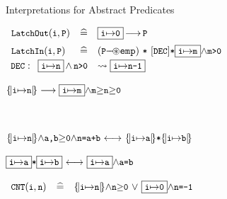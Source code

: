\documentclass[11pt]{beamer}
\begin{document}
\begin{frame}{Interpretations for Abstract Predicates}
\begin{small}
$
\begin{array}{lll}
\vspace{2mm}
 \LatchOut{i}{P} & \defs & \GLOBAL{i}{0} {\ourimply} \code{P}
\\
 \LatchIn{i}{P} &\defs &  (\code{P}{\septract}\emp) ~{\sep}~ [\DEC]  {\sep}\GLOBAL{i}{m} {\wedge}\code{m>0} 
 \\

\end{array}
$
$
\begin{array}{l}
\DEC: \begin{array}[t]{ll}
\GLOBAL{i}{n}\,{\wedge}\,\code{n{>}0} & \rightsquigarrow \GLOBAL{i}{n{-}1}
\end{array} \\
\end{array}\\
$
\end{small}
\pause
\vspace{2mm}
\begin{small}
$
\LOCAL{i}{n} \longrightarrow \GLOBALF{i}{m}{\code{m}{\geq}\code{n}{\geq}\code{0}}
$
\end{small} \\
\begin{small}
$
\LOCAL{i}{n}{\wedge}\code{a,b}{\geq}\code{0}{\wedge}{\code{n=a+b}}
~{\longleftrightarrow}~ \LOCAL{i}{a}{\sep}\LOCAL{i}{b} 
$
\end{small} 
\begin{small}
$
\GLOBAL{i}{a}{\sep}\GLOBAL{i}{b} 
~{\longleftrightarrow}~\GLOBAL{i}{a}{\wedge}\code{a{=}b}
$
\end{small}
\pause
\vspace{3mm}
\begin{small}
$
\begin{array}{lll}
\CNT{i}{n} &\defs & \LOCAL{i}{n} {\wedge}\code{n${\geq}$0}
~{\vee}~ \GLOBAL{i}{0}{\wedge}\code{n=-1} 
\end{array}
$
\end{small}

\end{frame}


\end{document}
